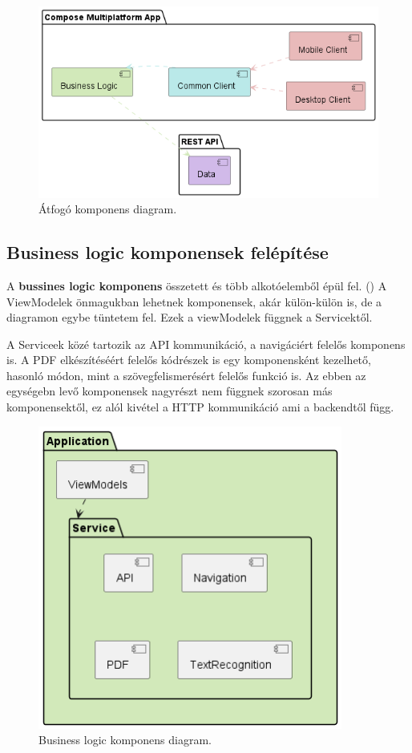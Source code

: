 \begin{figure}[!ht]
    \centering
    \includegraphics[width=150mm, keepaspectratio]{figures/Component.png}
    \caption{Átfogó komponens diagram.}
    \label{fig:ComponentDiagram}
\end{figure}

\subsection{Business logic komponensek felépítése}

A \textbf{bussines logic komponens} összetett és több alkotóelemből épül fel. ()
A ViewModelek önmagukban lehetnek komponensek, akár külön-külön is, de a diagramon egybe tüntetem fel.
Ezek a viewModelek függnek a Servicektől. 

A Serviceek közé tartozik az API kommunikáció, a navigáciért felelős komponens is.
A PDF elkészítéséért felelős kódrészek is egy komponensként kezelhető, hasonló módon, mint a szövegfelismerésért felelős funkció is.
Az ebben az egységebn levő komponensek nagyrészt nem függnek szorosan más komponensektől, ez alól kivétel a HTTP kommunikáció ami a backendtől függ.


\begin{figure}[!ht]
    \centering
    \includegraphics[width=100mm, keepaspectratio]{figures/Business Component.png}
    \caption{Business logic komponens diagram.}
    \label{fig:BusinessComponentDiagram}
\end{figure}


